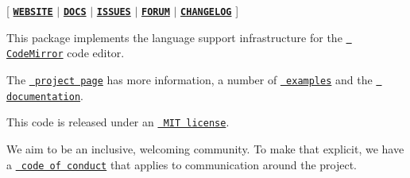 \mbox{[} \href{https://codemirror.net/}{\texttt{ {\bfseries{W\+E\+B\+S\+I\+TE}}}} $\vert$ \href{https://codemirror.net/docs/ref/\#language}{\texttt{ {\bfseries{D\+O\+CS}}}} $\vert$ \href{https://github.com/codemirror/dev/issues}{\texttt{ {\bfseries{I\+S\+S\+U\+ES}}}} $\vert$ \href{https://discuss.codemirror.net/c/next/}{\texttt{ {\bfseries{F\+O\+R\+UM}}}} $\vert$ \href{https://github.com/codemirror/language/blob/main/CHANGELOG.md}{\texttt{ {\bfseries{C\+H\+A\+N\+G\+E\+L\+OG}}}} \mbox{]}

This package implements the language support infrastructure for the \href{https://codemirror.net/}{\texttt{ Code\+Mirror}} code editor.

The \href{https://codemirror.net/}{\texttt{ project page}} has more information, a number of \href{https://codemirror.net/examples/}{\texttt{ examples}} and the \href{https://codemirror.net/docs/}{\texttt{ documentation}}.

This code is released under an \href{https://github.com/codemirror/language/tree/main/LICENSE}{\texttt{ M\+IT license}}.

We aim to be an inclusive, welcoming community. To make that explicit, we have a \href{http://contributor-covenant.org/version/1/1/0/}{\texttt{ code of conduct}} that applies to communication around the project. 